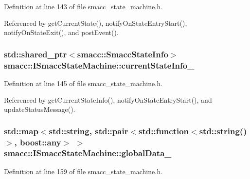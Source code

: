Definition at line 143 of file smacc\+\_\+state\+\_\+machine.\+h.



Referenced by get\+Current\+State(), notify\+On\+State\+Entry\+Start(), notify\+On\+State\+Exit(), and post\+Event().

\subsubsection[{\texorpdfstring{current\+State\+Info\+\_\+}{currentStateInfo_}}]{\setlength{\rightskip}{0pt plus 5cm}std\+::shared\+\_\+ptr$<${\bf smacc\+::\+Smacc\+State\+Info}$>$ smacc\+::\+I\+Smacc\+State\+Machine\+::current\+State\+Info\+\_\+\hspace{0.3cm}{\ttfamily [protected]}}\hypertarget{classsmacc_1_1ISmaccStateMachine_ac8ac420db18ed72cc0c7535f16c0aae8}{}\label{classsmacc_1_1ISmaccStateMachine_ac8ac420db18ed72cc0c7535f16c0aae8}


Definition at line 145 of file smacc\+\_\+state\+\_\+machine.\+h.



Referenced by get\+Current\+State\+Info(), notify\+On\+State\+Entry\+Start(), and update\+Status\+Message().

\subsubsection[{\texorpdfstring{global\+Data\+\_\+}{globalData_}}]{\setlength{\rightskip}{0pt plus 5cm}std\+::map$<$std\+::string, std\+::pair$<$std\+::function$<$std\+::string()$>$, boost\+::any$>$ $>$ smacc\+::\+I\+Smacc\+State\+Machine\+::global\+Data\+\_\+\hspace{0.3cm}{\ttfamily [private]}}\hypertarget{classsmacc_1_1ISmaccStateMachine_ad2f9dae184ea942db632ac4532a10a91}{}\label{classsmacc_1_1ISmaccStateMachine_ad2f9dae184ea942db632ac4532a10a91}


Definition at line 159 of file smacc\+\_\+state\+\_\+machine.\+h.



